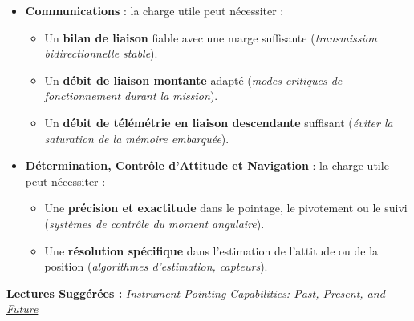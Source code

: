 \begin{itemize}
    \item \textbf{Communications} : la charge utile peut nécessiter :
    \begin{itemize}
        \item Un \textbf{bilan de liaison} fiable avec une marge suffisante (\textit{transmission bidirectionnelle stable}).  
        \item Un \textbf{débit de liaison montante} adapté (\textit{modes critiques de fonctionnement durant la mission}).  
        \item Un \textbf{débit de télémétrie en liaison descendante} suffisant (\textit{éviter la saturation de la mémoire embarquée}).  
    \end{itemize}
    \item \textbf{Détermination, Contrôle d'Attitude et Navigation} : la charge utile peut nécessiter :
    \begin{itemize}
        \item Une \textbf{précision et exactitude} dans le pointage, le pivotement ou le suivi (\textit{systèmes de contrôle du moment angulaire}).  
        \item Une \textbf{résolution spécifique} dans l'estimation de l'attitude ou de la position (\textit{algorithmes d'estimation, capteurs}).  
    \end{itemize}
\end{itemize}
\textbf{Lectures Suggérées :}  
\textit{\href{https://trs.jpl.nasa.gov/bitstream/handle/2014/41915/11-0422.pdf?sequence=1}
{Instrument Pointing Capabilities: Past, Present, and Future}}

